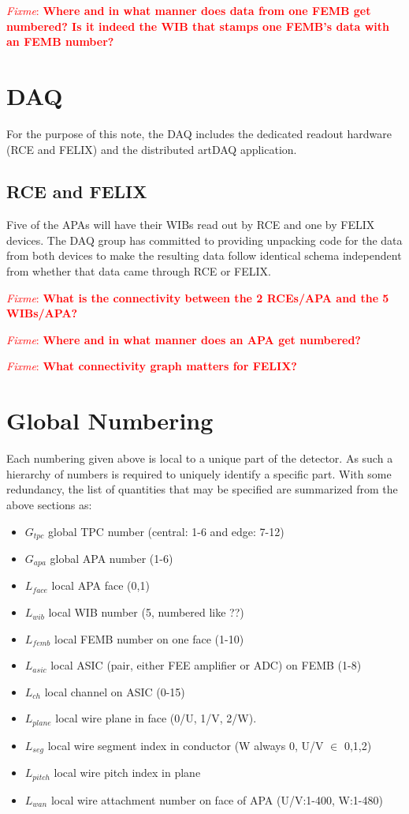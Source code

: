 \documentclass[pdftex,12pt,letter]{article}
\newcommand{\fixme}[1]{\textcolor{red}{\textit{Fixme}: \textbf{#1}}}
\begin{document}
\fixme{Where and in what manner does data from one FEMB get numbered?  Is it indeed the WIB that stamps one FEMB's data with an FEMB number?}


\section{DAQ}

For the purpose of this note, the DAQ includes the dedicated readout
hardware (RCE and FELIX) and the distributed artDAQ application.

\subsection{RCE and FELIX}

Five of the APAs will have their WIBs read out by RCE and one by FELIX
devices.  The DAQ group has committed to providing unpacking code for
the data from both devices to make the resulting data follow identical
schema independent from whether that data came through RCE or FELIX.

\fixme{What is the connectivity between the 2 RCEs/APA and the 5 WIBs/APA?}

\fixme{Where and in what manner does an APA get numbered?}

\fixme{What connectivity graph matters for FELIX?}

\section{Global Numbering}

Each numbering given above is local to a unique part of the detector.
As such a hierarchy of numbers is required to uniquely identify a
specific part.  With some redundancy, the list of quantities that may
be specified are summarized from the above sections as:

\begin{itemize}
\item $G_{tpc}$ global TPC number (central: 1-6 and edge: 7-12)
\item $G_{apa}$ global APA number (1-6)
\item $L_{face}$ local APA face (0,1)
\item $L_{wib}$ local WIB number (5, numbered like ??)
\item $L_{femb}$ local FEMB number on one face (1-10)
\item $L_{asic}$ local ASIC (pair, either FEE amplifier or ADC) on FEMB (1-8)
\item $L_{ch}$ local channel on ASIC (0-15)
\item $L_{plane}$ local wire plane in face (0/U, 1/V, 2/W).
\item $L_{seg}$ local wire segment index in conductor (W always 0, U/V $\in$ 0,1,2)
\item $L_{pitch}$ local wire pitch index in plane
\item $L_{wan}$ local wire attachment number on face of APA (U/V:1-400, W:1-480)
\end{itemize}
\end{document}
